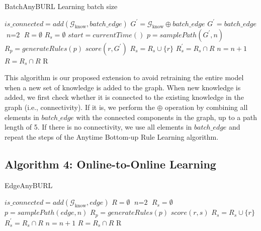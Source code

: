 \begin{algorithm}
	\caption{BatchAnyBURL Learning batch size}
	\label{alg:BatchAnyBURL}
	\begin{algorithmic}[1]
		\State $is\_connected = add(\mathcal{G}_{\text{know}}, batch\_edge)$
		\State  $ G^{\prime} = \mathcal{G}_{\text{know}} \oplus batch\_edge$
		\Else
		\State  $ G^{\prime} = batch\_edge$
		\EndIf
		\State $\textit{n} = \text{2}$
		\State $R = \emptyset$
		\Loop
		\State $R_s = \emptyset$
		\State $start = currentTime()$
		\Repeat
		\State $p = samplePath(G^{\prime}, n)$
		\State $R_p = generateRules(p)$
		\State $score(r, G^{\prime})$
		\State $R_s = R_s \cup \{r\}$
		\EndIf
		\EndFor
		\State $R^{\prime}_s = R_s \cap R$
		\State $n = n + 1$
		\EndIf
		\State $R = R_s \cap R$
		\EndLoop
		\Return R
		\EndProcedure
	\end{algorithmic}
\end{algorithm}

This algorithm is our proposed extension to avoid retraining the entire model when a new set of knowledge is added to the graph. When new knowledge is added, we first check whether it is connected to the existing knowledge in the graph (i.e., connectivity). If it is, we perform the \(\oplus\) operation by combining all elements in \(batch\_edge\) with the connected components in the graph, up to a path length of 5. If there is no connectivity, we use all elements in \(batch\_edge\) and repeat the steps of the Anytime Bottom-up Rule Learning algorithm.


\pagebreak

\subsection{Algorithm 4: Online-to-Online Learning}



\begin{algorithm}
	\caption{EdgeAnyBURL}
	\label{alg:EdgeAnyBURL}
	\begin{algorithmic}[1]
		\State $is\_connected = add(\mathcal{G}_{\text{know}}, edge)$
		\State $R = \emptyset$
		\State $\textit{n} = \text{2}$
		\State $R_s = \emptyset$
		\Repeat
		\State $p = samplePath(edge, n)$
		\State $R_p = generateRules(p)$
		\State $score(r, s)$
		\State $R_s = R_s \cup \{r\}$
		\EndIf
		\EndFor
		\State $R^{\prime}_s = R_s \cap R$
		\State $n = n + 1$
		\EndIf
		\State $R = R_s \cap R$
		\EndIf
		\State \Return R
		\EndProcedure
	\end{algorithmic}
\end{algorithm}

